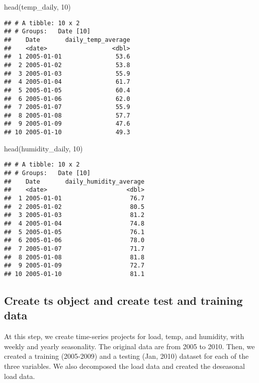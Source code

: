 \documentclass[
]{article}
\newenvironment{Shaded}{\begin{snugshade}}{\end{snugshade}}
\newcommand{\DecValTok}[1]{\textcolor[rgb]{0.00,0.00,0.81}{#1}}
\newcommand{\FunctionTok}[1]{\textcolor[rgb]{0.00,0.00,0.00}{#1}}
\newcommand{\NormalTok}[1]{#1}
\begin{document}
\begin{Shaded}
\begin{Highlighting}[]
\FunctionTok{head}\NormalTok{(temp\_daily, }\DecValTok{10}\NormalTok{)}
\end{Highlighting}
\end{Shaded}

\begin{verbatim}
## # A tibble: 10 x 2
## # Groups:   Date [10]
##    Date       daily_temp_average
##    <date>                  <dbl>
##  1 2005-01-01               53.6
##  2 2005-01-02               53.8
##  3 2005-01-03               55.9
##  4 2005-01-04               61.7
##  5 2005-01-05               60.4
##  6 2005-01-06               62.0
##  7 2005-01-07               55.9
##  8 2005-01-08               57.7
##  9 2005-01-09               47.6
## 10 2005-01-10               49.3
\end{verbatim}

\begin{Shaded}
\begin{Highlighting}[]
\FunctionTok{head}\NormalTok{(humidity\_daily, }\DecValTok{10}\NormalTok{)}
\end{Highlighting}
\end{Shaded}

\begin{verbatim}
## # A tibble: 10 x 2
## # Groups:   Date [10]
##    Date       daily_humidity_average
##    <date>                      <dbl>
##  1 2005-01-01                   76.7
##  2 2005-01-02                   80.5
##  3 2005-01-03                   81.2
##  4 2005-01-04                   74.8
##  5 2005-01-05                   76.1
##  6 2005-01-06                   78.0
##  7 2005-01-07                   71.7
##  8 2005-01-08                   81.8
##  9 2005-01-09                   72.7
## 10 2005-01-10                   81.1
\end{verbatim}

\hypertarget{create-ts-object-and-create-test-and-training-data}{%
\subsection{Create ts object and create test and training
data}\label{create-ts-object-and-create-test-and-training-data}}

At this step, we create time-series projects for load, temp, and
humidity, with weekly and yearly seasonality. The original data are from
2005 to 2010. Then, we created a training (2005-2009) and a testing
(Jan, 2010) dataset for each of the three variables. We also decomposed
the load data and created the deseasonal load data.
\end{document}
